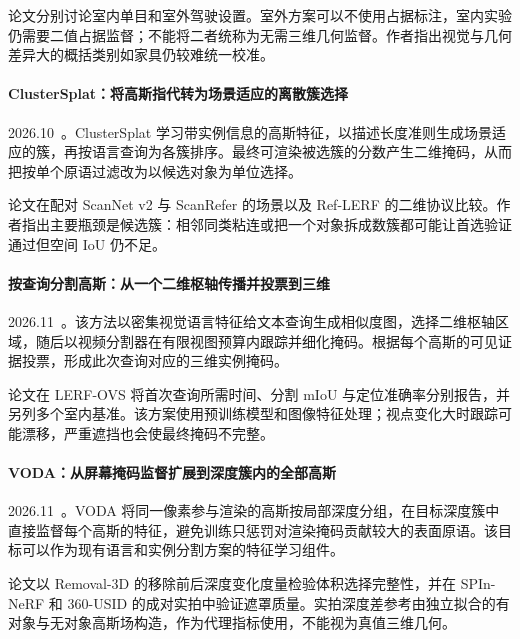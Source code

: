 论文分别讨论室内单目和室外驾驶设置。室外方案可以不使用占据标注，室内实验仍需要二值占据监督；不能将二者统称为无需三维几何监督。作者指出视觉与几何差异大的概括类别如家具仍较难统一校准。

\paragraph{ClusterSplat：将高斯指代转为场景适应的离散簇选择}
2026.10~\cite{2610_36462}。ClusterSplat 学习带实例信息的高斯特征，以描述长度准则生成场景适应的簇，再按语言查询为各簇排序。最终可渲染被选簇的分数产生二维掩码，从而把按单个原语过滤改为以候选对象为单位选择。

论文在配对 ScanNet v2 与 ScanRefer 的场景以及 Ref-LERF 的二维协议比较。作者指出主要瓶颈是候选簇：相邻同类粘连或把一个对象拆成数簇都可能让首选验证通过但空间 IoU 仍不足。

\paragraph{按查询分割高斯：从一个二维枢轴传播并投票到三维}
2026.11~\cite{2611_19429}。该方法以密集视觉语言特征给文本查询生成相似度图，选择二维枢轴区域，随后以视频分割器在有限视图预算内跟踪并细化掩码。根据每个高斯的可见证据投票，形成此次查询对应的三维实例掩码。

论文在 LERF-OVS 将首次查询所需时间、分割 mIoU 与定位准确率分别报告，并另列多个室内基准。该方案使用预训练模型和图像特征处理；视点变化大时跟踪可能漂移，严重遮挡也会使最终掩码不完整。

\paragraph{VODA：从屏幕掩码监督扩展到深度簇内的全部高斯}
2026.11~\cite{2611_21383}。VODA 将同一像素参与渲染的高斯按局部深度分组，在目标深度簇中直接监督每个高斯的特征，避免训练只惩罚对渲染掩码贡献较大的表面原语。该目标可以作为现有语言和实例分割方案的特征学习组件。

论文以 Removal-3D 的移除前后深度变化度量检验体积选择完整性，并在 SPIn-NeRF 和 360-USID 的成对实拍中验证遮罩质量。实拍深度差参考由独立拟合的有对象与无对象高斯场构造，作为代理指标使用，不能视为真值三维几何。
